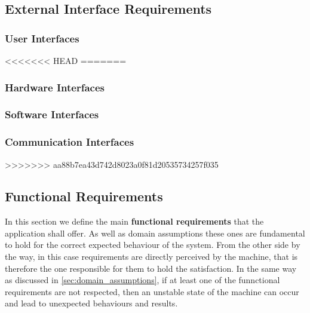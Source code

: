 \subsection{External Interface Requirements}
\subsubsection{User Interfaces}
\vspace{-6mm}

<<<<<<< HEAD
=======
\subsubsection{Hardware Interfaces}

\subsubsection{Software Interfaces}

\subsubsection{Communication Interfaces}

>>>>>>> aa88b7ea43d742d8023a0f81d20535734257f035

\subsection{Functional Requirements}
In this section we define the main \textbf{functional requirements} that the application shall offer. As well as domain assumptions these ones are fundamental to hold for the correct expected behaviour of the system. From the other side by the way, in this case requirements are directly perceived by the machine, that is therefore the one responsible for them to hold the satisfaction. In the same way as discussed in \ref{sec:domain_assumptions}, if at least one of the funnctional requirements are not respected, then an unstable state of the machine can occur and lead to unexpected behaviours and results.
\newline\newline
{}
\newline\newline
{}
\newline\newline
{}

